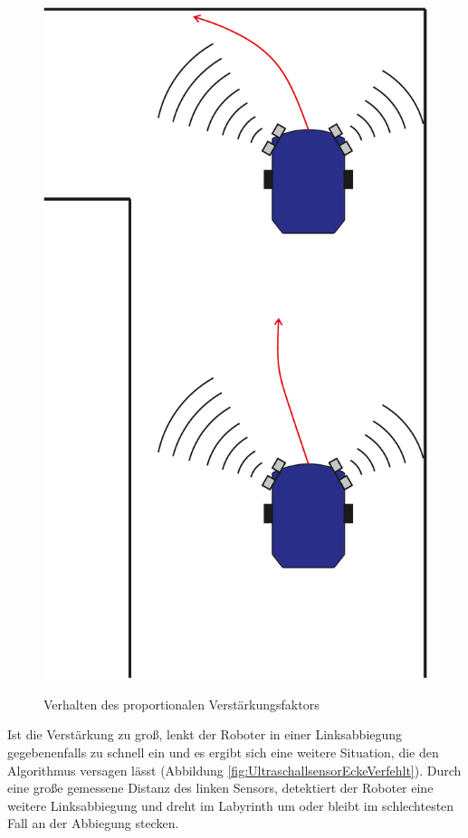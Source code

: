 \documentclass[12pt,a4paper,oneside]{article}
\begin{document}
\begin{spacing}{1.15}
\begin{figure}[!htb]
	{\includegraphics[scale=.25]{figs/lowgain}}
	\caption{Verhalten des proportionalen Verstärkungsfaktors}
	\label{fig:pcontrolgain}
\end{figure}
 \newpage
Ist die Verstärkung zu groß, lenkt der Roboter in einer Linksabbiegung gegebenenfalls zu schnell ein und es ergibt sich eine weitere Situation, die den Algorithmus versagen lässt (Abbildung \ref{fig:UltraschallsensorEckeVerfehlt}). Durch eine große gemessene Distanz des linken Sensors, detektiert der Roboter eine weitere Linksabbiegung und dreht im Labyrinth um oder bleibt im schlechtesten Fall an der Abbiegung stecken.


\end{spacing}
\end{document}
